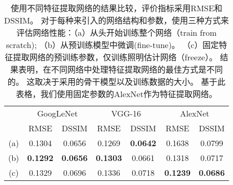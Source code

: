 \begin{table}[ht]
    \centering
    \caption[不同特征提取网络的对比]{
    \label{table:backbone}
    使用不同特征提取网络的结果比较，评价指标采用RMSE和DSSIM。 对于每种来引入的网络结构和参数，使用三种方式来评估网络性能：（a）从头开始训练整个网络（train from scratch); （b）从预训练模型中微调(fine-tune)。 （c）固定特征提取网络的预训练参数，仅训练照明估计网络（freeze）。 结果表明，在不同网络中处理特征提取网络的最佳方式是不同的。 这取决于采用的骨干模型以及训练数据的大小。 基于此表格，我们使用固定参数的AlexNet作为特征提取网络。
    }
    \begin{tabular}{c|c|c|c|c|c|c} 
     \hline
    \multirow{2}{*}{}  & \multicolumn{2}{c|}{GoogLeNet} & \multicolumn{2}{c|}{VGG-16} & \multicolumn{2}{c}{AlexNet} \\ \cline{2-7}
    ~&RMSE&DSSIM&RMSE&DSSIM&RMSE&DSSIM\\
    \hline
    (a) & 0.1304 & 0.0656 & 0.1269 & \textbf{0.0642} & 0.1638 & 0.0799 \\
    (b) & \textbf{0.1292} & \textbf{0.0656} & \textbf{0.1303} & 0.0661 & 0.1318 & 0.0717 \\
    (c) & 0.1329 & 0.0696 & 0.1336 & 0.0718 & \textbf{0.1239} & \textbf{0.0686} \\
    \hline 
    \end{tabular}
\end{table}
